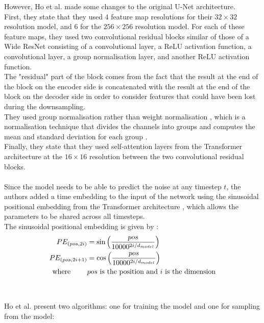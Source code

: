 \documentclass[twoside]{article}
\numberwithin{equation}{section}
\numberwithin{figure}{section}
\begin{document}
However, Ho et al. \cite{ho2020denoising} made some changes to the original U-Net architecture. \\
First, they state that they used 4 feature map resolutions for their $32 \times 32$ resolution model, and 6 for the $256 \times 256$ resolution model. For each of these feature maps, they used two convolutional residual blocks similar of those of a Wide ResNet \cite{zagoruyko2017wide} consisting of a convolutional layer, a ReLU activation function, a convolutional layer, a group normalisation layer, and another ReLU activation function. \\ 
The "residual" part of the block comes from the fact that the result at the end of the block on the encoder side is concatenated with the result at the end of the block on the decoder side in order to consider features that could have been lost during the downsampling. \cite{lai2022rethinking} \\
They used group normalisation \cite{wu2018group} rather than weight normalisation \cite{salimans2016weight}, which is a normalisation technique that divides the channels into groups and computes the mean and standard deviation for each group \cite{ho2020denoising}. \\
Finally, they state that they used self-attention layers from the Transformer architecture \cite{vaswani2023attention} at the $16 \times 16$ resolution between the two convolutional residual blocks. \cite{ho2020denoising}
\\\\
Since the model needs to be able to predict the noise at any timestep $t$, the authors added a time embedding to the input of the network using the sinusoidal positional embedding from the Transformer architecture \cite{vaswani2023attention}, which allows the parameters to be shared across all timesteps. \\
The sinusoidal positional embedding is given by \cite{vaswani2023attention}:
\begin{align}
  PE_{(pos, 2i)} &= \sin \left( \frac{pos}{10000^{2i/d_{model}}} \right) \\
  PE_{(pos, 2i+1)} &= \cos \left( \frac{pos}{10000^{2i/d_{model}}} \right) \\
  \text{where } \qquad & pos \text{ is the position and } i \text{ is the dimension} \notag
\end{align}
\\\\
Ho et al. \cite{ho2020denoising} present two algorithms: one for training the model and one for sampling from the model:
\end{document}
